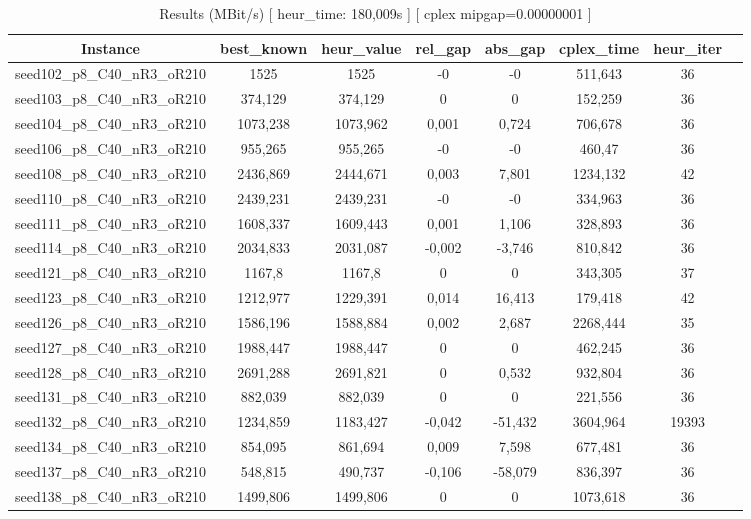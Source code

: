 \documentclass[a4paper]{article}
\begin{document}
\begin{center}
\begin{longtable}{cccccccc}
\caption{Results (MBit/s) [ heur\_time: 180,009s ]  [ cplex mipgap=0.00000001 ]}
\tabularnewline
\hline
Instance & best\_known & heur\_value & rel\_gap & abs\_gap & cplex\_time & heur\_iter\\
\hline
seed102\_p8\_C40\_nR3\_oR210 & 1525 & 1525 & -0 & -0 & 511,643 & 36\\
\hline
seed103\_p8\_C40\_nR3\_oR210 & 374,129 & 374,129 & 0 & 0 & 152,259 & 36\\
\hline
seed104\_p8\_C40\_nR3\_oR210 & 1073,238 & 1073,962 & 0,001 & 0,724 & 706,678 & 36\\
\hline
seed106\_p8\_C40\_nR3\_oR210 & 955,265 & 955,265 & -0 & -0 & 460,47 & 36\\
\hline
seed108\_p8\_C40\_nR3\_oR210 & 2436,869 & 2444,671 & 0,003 & 7,801 & 1234,132 & 42\\
\hline
seed110\_p8\_C40\_nR3\_oR210 & 2439,231 & 2439,231 & -0 & -0 & 334,963 & 36\\
\hline
seed111\_p8\_C40\_nR3\_oR210 & 1608,337 & 1609,443 & 0,001 & 1,106 & 328,893 & 36\\
\hline
seed114\_p8\_C40\_nR3\_oR210 & 2034,833 & 2031,087 & -0,002 & -3,746 & 810,842 & 36\\
\hline
seed121\_p8\_C40\_nR3\_oR210 & 1167,8 & 1167,8 & 0 & 0 & 343,305 & 37\\
\hline
seed123\_p8\_C40\_nR3\_oR210 & 1212,977 & 1229,391 & 0,014 & 16,413 & 179,418 & 42\\
\hline
seed126\_p8\_C40\_nR3\_oR210 & 1586,196 & 1588,884 & 0,002 & 2,687 & 2268,444 & 35\\
\hline
seed127\_p8\_C40\_nR3\_oR210 & 1988,447 & 1988,447 & 0 & 0 & 462,245 & 36\\
\hline
seed128\_p8\_C40\_nR3\_oR210 & 2691,288 & 2691,821 & 0 & 0,532 & 932,804 & 36\\
\hline
seed131\_p8\_C40\_nR3\_oR210 & 882,039 & 882,039 & 0 & 0 & 221,556 & 36\\
\hline
seed132\_p8\_C40\_nR3\_oR210 & 1234,859 & 1183,427 & -0,042 & -51,432 & 3604,964 & 19393\\
\hline
seed134\_p8\_C40\_nR3\_oR210 & 854,095 & 861,694 & 0,009 & 7,598 & 677,481 & 36\\
\hline
seed137\_p8\_C40\_nR3\_oR210 & 548,815 & 490,737 & -0,106 & -58,079 & 836,397 & 36\\
\hline
seed138\_p8\_C40\_nR3\_oR210 & 1499,806 & 1499,806 & 0 & 0 & 1073,618 & 36\\

\end{longtable}
\end{center}
\end{document}
